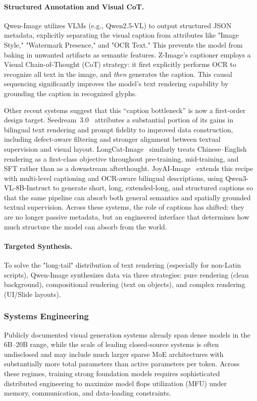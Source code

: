 \documentclass{llmxive}
\begin{document}
\paragraph{Structured Annotation and Visual CoT.}
Qwen-Image utilizes VLMs (e.g., Qwen2.5-VL) to output structured JSON metadata, explicitly separating the visual caption from attributes like "Image Style," "Watermark Presence," and "OCR Text." This prevents the model from baking in unwanted artifacts as semantic features. Z-Image's captioner employs a Visual Chain-of-Thought (CoT) strategy: it first explicitly performs OCR to recognize all text in the image, and \textit{then} generates the caption. This causal sequencing significantly improves the model's text rendering capability by grounding the caption in recognized glyphs.

Other recent systems suggest that this ``caption bottleneck'' is now a first-order design target. Seedream~3.0~\citep{gao2025seedream} attributes a substantial portion of its gains in bilingual text rendering and prompt fidelity to improved data construction, including defect-aware filtering and stronger alignment between textual supervision and visual layout. LongCat-Image~\citep{team2025longcat} similarly treats Chinese--English rendering as a first-class objective throughout pre-training, mid-training, and SFT rather than as a downstream afterthought. JoyAI-Image~\citep{jdjoyaiimage} extends this recipe with multi-level captioning and OCR-aware bilingual descriptions, using Qwen3-VL-8B-Instruct to generate short, long, extended-long, and structured captions so that the same pipeline can absorb both general semantics and spatially grounded textual supervision. Across these systems, the role of captions has shifted: they are no longer passive metadata, but an engineered interface that determines how much structure the model can absorb from the world.

\paragraph{Targeted Synthesis.}
To solve the "long-tail" distribution of text rendering (especially for non-Latin scripts), Qwen-Image synthesizes data via three strategies: pure rendering (clean background), compositional rendering (text on objects), and complex rendering (UI/Slide layouts).

\subsubsection{Systems Engineering}
Publicly documented visual generation systems already span dense models in the 6B--20B range, while the scale of leading closed-source systems is often undisclosed and may include much larger sparse MoE architectures with substantially more total parameters than active parameters per token. Across these regimes, training strong foundation models requires sophisticated distributed engineering to maximize model flops utilization (MFU) under memory, communication, and data-loading constraints.
\end{document}
